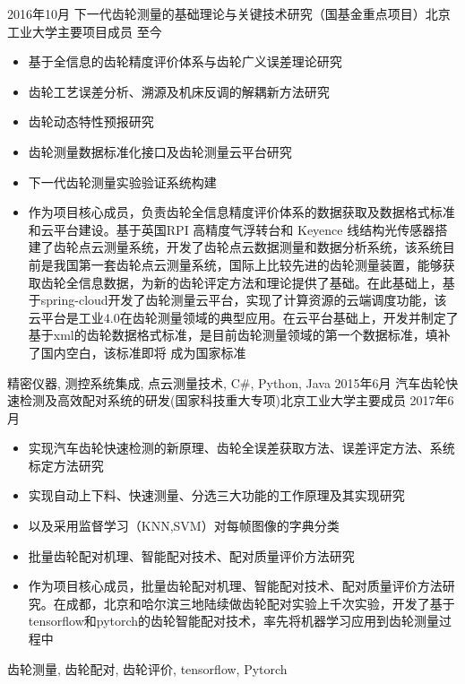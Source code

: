 %
%



\begin{experiences}

  \experience
  {2016年10月}   {下一代齿轮测量的基础理论与关键技术研究（国基金重点项目）}{北京工业大学}{主要项目成员}
  {至今} {
    \begin{itemize}
      \item 基于全信息的齿轮精度评价体系与齿轮广义误差理论研究
      \item 齿轮工艺误差分析、溯源及机床反调的解耦新方法研究
      \item 齿轮动态特性预报研究
      \item 齿轮测量数据标准化接口及齿轮测量云平台研究
      \item 下一代齿轮测量实验验证系统构建
      \item 作为项目核心成员，负责齿轮全信息精度评价体系的数据获取及数据格式标准和云平台建设。基于英国RPI 高精度气浮转台和 Keyence 线结构光传感器搭建了齿轮点云测量系统，开发了齿轮点云数据测量和数据分析系统，该系统目前是我国第一套齿轮点云测量系统，国际上比较先进的齿轮测量装置，能够获取齿轮全信息数据，为新的齿轮评定方法和理论提供了基础。在此基础上，基于spring-cloud开发了齿轮测量云平台，实现了计算资源的云端调度功能，该云平台是工业4.0在齿轮测量领域的典型应用。在云平台基础上，开发并制定了基于xml的齿轮数据格式标准，是目前齿轮测量领域的第一个数据标准，填补了国内空白，该标准即将
            成为国家标准
    \end{itemize}
  }
  {精密仪器, 测控系统集成, 点云测量技术, C\#, Python, Java}
  \emptySeparator
  \experience
  {2015年6月} {汽车齿轮快速检测及高效配对系统的研发(国家科技重大专项)}{北京工业大学}{主要成员}
  {2017年6月}    {
    \begin{itemize}
      \item 实现汽车齿轮快速检测的新原理、齿轮全误差获取方法、误差评定方法、系统标定方法研究
      \item 实现自动上下料、快速测量、分选三大功能的工作原理及其实现研究
      \item 以及采用监督学习（KNN,SVM）对每帧图像的字典分类
      \item 批量齿轮配对机理、智能配对技术、配对质量评价方法研究
      \item 作为项目核心成员，批量齿轮配对机理、智能配对技术、配对质量评价方法研究。在成都，北京和哈尔滨三地陆续做齿轮配对实验上千次实验，开发了基于tensorflow和pytorch的齿轮智能配对技术，率先将机器学习应用到齿轮测量过程中
    \end{itemize}
  }
  {齿轮测量, 齿轮配对, 齿轮评价, tensorflow, Pytorch}


\end{experiences}

